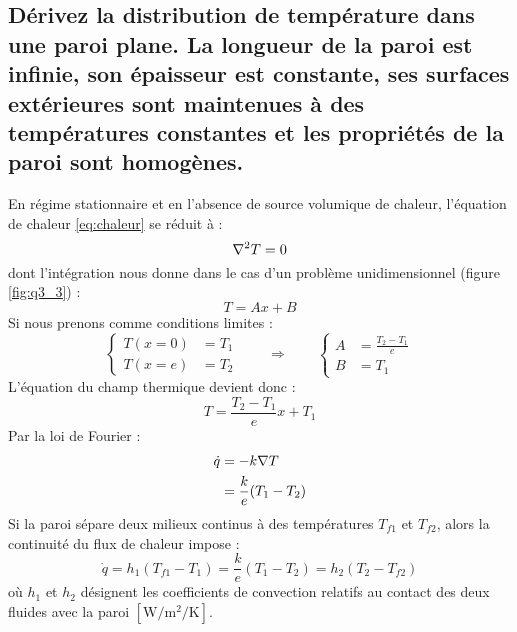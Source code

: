 \subsection{Dérivez la distribution de température dans une paroi plane. La longueur de la paroi est infinie, son épaisseur est constante, ses surfaces extérieures sont maintenues à des températures constantes et les propriétés de la paroi sont homogènes.}
En régime stationnaire et en l'absence de source volumique de chaleur, l'équation de chaleur \ref{eq:chaleur} se réduit à :
\begin{equation} \nabla ^2T = 0 \end{equation}
dont l'intégration nous donne dans le cas d'un problème unidimensionnel (figure \ref{fig:q3_3}) :
\begin{equation} T = Ax+B \end{equation}
Si nous prenons comme conditions limites :
\begin{equation} \begin{cases} T(x=0) &= T_1 \\ T(x=e) &= T_2 \end{cases} \qquad \Rightarrow \qquad \begin{cases} A &= \frac{T_2-T_1}{e} \\ B &= T_1 \end{cases} \end{equation}
L'équation du champ thermique devient donc :
\begin{equation} T = \frac{T_2-T_1}{e}x+T_1 \end{equation}
Par la loi de Fourier :
\begin{align} \dot{q} &= -k\nabla T \\ &= \frac{k}{e}(T_1-T_2) \end{align}
Si la paroi sépare deux milieux continus à des températures $T_{f1}$ et $T_{f2}$, alors la continuité du flux de chaleur impose :
\begin{equation} \dot{q} = h_1(T_{f1}-T_1) = \frac{k}{e}(T_1-T_2) = h_2(T_2-T_{f2}) \end{equation}
où $h_1$ et $h_2$ désignent les coefficients de convection relatifs au contact des deux fluides avec la paroi $[\si{\watt\per\meter\squared\per\kelvin}]$.
